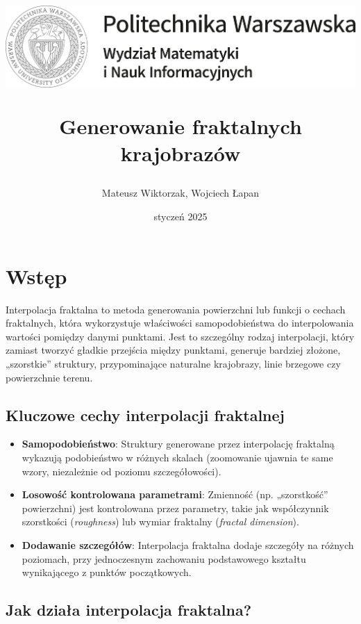\documentclass{article}
\title{
    \centerline{\includegraphics[width = 16cm]{PW_MiNI_PL_czarny_RGB.png}}
    \vspace{0.7cm}
    \textbf{Generowanie fraktalnych krajobrazów}
}
\author{Mateusz Wiktorzak, Wojciech Łapan}
\date{styczeń 2025}
\begin{document}
\maketitle

\tableofcontents

\vspace{0.4cm}

\section{Wstęp}

Interpolacja fraktalna to metoda generowania powierzchni lub funkcji o cechach fraktalnych, która wykorzystuje właściwości samopodobieństwa do interpolowania wartości pomiędzy danymi punktami. Jest to szczególny rodzaj interpolacji, który zamiast tworzyć gładkie przejścia między punktami, generuje bardziej złożone, „szorstkie” struktury, przypominające naturalne krajobrazy, linie brzegowe czy powierzchnie terenu.

\subsection{Kluczowe cechy interpolacji fraktalnej}

\begin{itemize}
    \item \textbf{Samopodobieństwo}: Struktury generowane przez interpolację fraktalną wykazują podobieństwo w różnych skalach (zoomowanie ujawnia te same wzory, niezależnie od poziomu szczegółowości).
    \item \textbf{Losowość kontrolowana parametrami}: Zmienność (np. „szorstkość” powierzchni) jest kontrolowana przez parametry, takie jak współczynnik szorstkości (\textit{roughness}) lub wymiar fraktalny (\textit{fractal dimension}).
    \item \textbf{Dodawanie szczegółów}: Interpolacja fraktalna dodaje szczegóły na różnych poziomach, przy jednoczesnym zachowaniu podstawowego kształtu wynikającego z punktów początkowych.
\end{itemize}

\subsection{Jak działa interpolacja fraktalna?}
\end{document}

